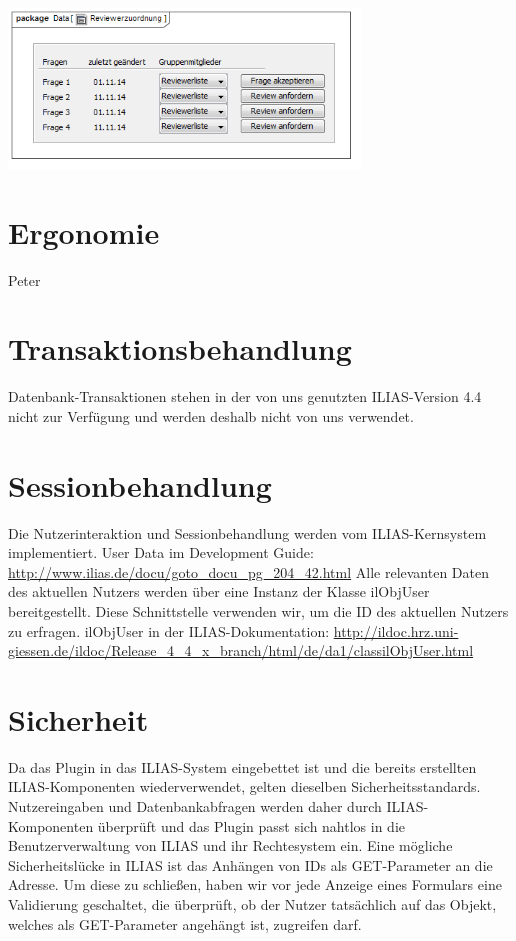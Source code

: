 \documentclass[a4paper]{scrreprt}
\begin{document}
\label{Grafische Benutzeroberfläche Autor}
\\
\includegraphics[width=0.7\textwidth]{User_Interface_Modeling_Diagram__Reviewerzuordnung.png}
\label{Grafische Benutzeroberfläche Autor}
\section{Ergonomie}
\flushleft
{Peter}
\section{Transaktionsbehandlung}
Datenbank-Transaktionen stehen in der von uns genutzten ILIAS-Version 4.4 nicht zur Verfügung und werden deshalb nicht von uns verwendet.
\section{Sessionbehandlung}
Die Nutzerinteraktion und Sessionbehandlung werden vom ILIAS-Kernsystem implementiert.
User Data im Development Guide: \url{http://www.ilias.de/docu/goto_docu_pg_204_42.html}
Alle relevanten Daten des aktuellen Nutzers werden über eine Instanz der Klasse ilObjUser bereitgestellt. Diese Schnittstelle verwenden wir, um die ID des aktuellen Nutzers zu erfragen.
ilObjUser in der ILIAS-Dokumentation: \url{http://ildoc.hrz.uni-giessen.de/ildoc/Release_4_4_x_branch/html/de/da1/classilObjUser.html}
\section{Sicherheit}
Da das Plugin in das ILIAS-System eingebettet ist und die bereits erstellten ILIAS-Komponenten wiederverwendet, gelten dieselben Sicherheitsstandards. Nutzereingaben und Datenbankabfragen werden daher durch ILIAS-Komponenten überprüft und das Plugin passt sich nahtlos in die Benutzerverwaltung von ILIAS und ihr Rechtesystem ein. Eine mögliche Sicherheitslücke in ILIAS ist das Anhängen von IDs als GET-Parameter an die Adresse. Um diese zu schließen, haben wir vor jede Anzeige eines Formulars eine Validierung geschaltet, die überprüft, ob der Nutzer tatsächlich auf das Objekt, welches als GET-Parameter angehängt ist, zugreifen darf. 
\end{document}
